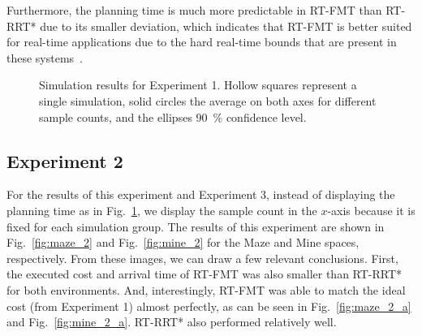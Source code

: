 Furthermore, the planning time is much more predictable in RT-FMT than RT-RRT* due to its smaller deviation, which indicates that RT-FMT is better suited for real-time applications due to the hard real-time bounds that are present in these systems~\cite{cserna2016anytime}.


\begin{figure}
\centering
{}
\caption{Simulation results for Experiment 1. Hollow squares represent a single simulation, solid circles the average on both axes for different sample counts, and the ellipses 90~\% confidence level.}
\label{fig:experiment_1}
\end{figure}

\subsection{Experiment 2}

For the results of this experiment and Experiment 3, instead of displaying the planning time as in Fig.~\ref{fig:experiment_1}, we display the sample count in the $x$-axis because it is fixed for each simulation group. The results of this experiment are shown in Fig.~\ref{fig:maze_2} and Fig.~\ref{fig:mine_2} for the Maze and Mine spaces, respectively. From these images, we can draw a few relevant conclusions. First, the executed cost and arrival time of RT-FMT was also smaller than RT-RRT* for both environments. And, interestingly, RT-FMT was able to match the ideal cost (from Experiment 1) almost perfectly, as can be seen in Fig.~\ref{fig:maze_2_a} and Fig.~\ref{fig:mine_2_a}. RT-RRT* also performed relatively well.

